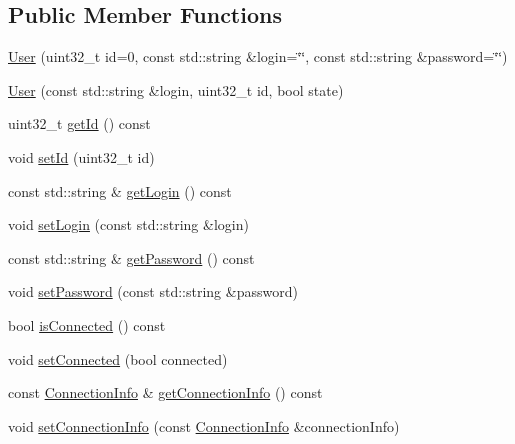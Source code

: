 \subsection*{Public Member Functions}
\begin{DoxyCompactItemize}
\item 
\mbox{\hyperlink{classbabel_1_1common_1_1_user_a0737ac6172fac228854e51e992203339}{User}} (uint32\+\_\+t id=0, const std\+::string \&login=\char`\"{}\char`\"{}, const std\+::string \&password=\char`\"{}\char`\"{})
\item 
\mbox{\hyperlink{classbabel_1_1common_1_1_user_a12d30f9811561f98d1039d42da0f4c5d}{User}} (const std\+::string \&login, uint32\+\_\+t id, bool state)
\item 
uint32\+\_\+t \mbox{\hyperlink{classbabel_1_1common_1_1_user_accd1833b33a6e7429ad2d43a28e1116a}{get\+Id}} () const
\item 
void \mbox{\hyperlink{classbabel_1_1common_1_1_user_af41e9f23dc42c669de4127cfb14da579}{set\+Id}} (uint32\+\_\+t id)
\item 
const std\+::string \& \mbox{\hyperlink{classbabel_1_1common_1_1_user_a9e4935028bc942da08a2eafcd4b0008b}{get\+Login}} () const
\item 
void \mbox{\hyperlink{classbabel_1_1common_1_1_user_ac5cd71368a7f95d120c58edab902ca24}{set\+Login}} (const std\+::string \&login)
\item 
const std\+::string \& \mbox{\hyperlink{classbabel_1_1common_1_1_user_a2b5c6ca06f0a664ba93ae3d4f473a887}{get\+Password}} () const
\item 
void \mbox{\hyperlink{classbabel_1_1common_1_1_user_a21a022eabf382fc25decbd79001bf206}{set\+Password}} (const std\+::string \&password)
\item 
bool \mbox{\hyperlink{classbabel_1_1common_1_1_user_a8af22580dc334973ac39cc74aed7c946}{is\+Connected}} () const
\item 
void \mbox{\hyperlink{classbabel_1_1common_1_1_user_a8ed42b85ce28caa1c04c2592e09e1925}{set\+Connected}} (bool connected)
\item 
const \mbox{\hyperlink{classbabel_1_1common_1_1_connection_info}{Connection\+Info}} \& \mbox{\hyperlink{classbabel_1_1common_1_1_user_a6dcd5d99ec1d1a789f71711c2601bef2}{get\+Connection\+Info}} () const
\item 
void \mbox{\hyperlink{classbabel_1_1common_1_1_user_a739b57a2489b0c7784a98852a0539ff1}{set\+Connection\+Info}} (const \mbox{\hyperlink{classbabel_1_1common_1_1_connection_info}{Connection\+Info}} \&connection\+Info)
\item 

\end{DoxyCompactItemize}
